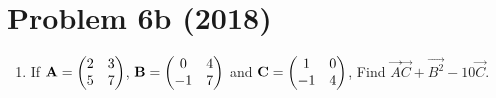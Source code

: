 \documentclass[journal,12pt,twocolumn]{IEEEtran}
\renewcommand\thesection{\arabic{section}}
\begin{document}
  \section{Problem 6b (2018)}
  \begin{enumerate}[label=\thesection.\arabic*.,ref=\thesection.\theenumi]
      \item If $\mathbf{A}=\begin{pmatrix}
        2 & 3 \\
        5 & 7 \\
      \end{pmatrix}$,
      $\mathbf{B}=\begin{pmatrix} 
        0 & 4 \\
       -1 & 7 \\
      \end{pmatrix}$ and $\mathbf{C} =\begin{pmatrix} 
        1 & 0 \\
        -1 & 4 \\
       \end{pmatrix}$, 
       Find $\vec{A}\vec{C}+\vec{B^2}-10\vec{C}.$


\end{enumerate}
\end{document}
